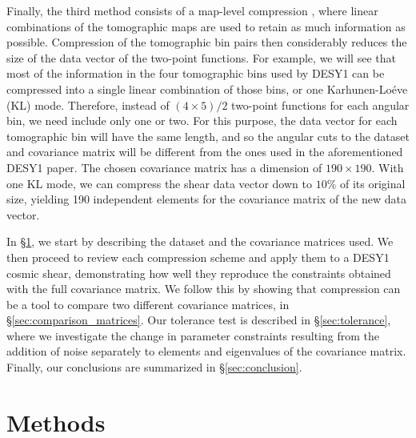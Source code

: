 \documentclass[aps, prd, twocolumn, superscriptaddress, nofootinbib, amssymb, amsmath]{revtex4-2}
\newcommand{\rsec}[1]{\S\ref{sec:#1}}
\begin{document}
Finally, the third method consists of a map-level compression \cite{Alonso:2017hhj}, where linear combinations of the tomographic maps are used to retain as much information as possible. Compression of the tomographic bin pairs then considerably reduces the size of the data vector of the two-point functions. For example, we will see that most of the information in the four tomographic bins used by DESY1 can be compressed into a single linear combination of those bins, or one Karhunen-Lo\'eve (KL) mode. Therefore, instead of $(4\times5)/2$ two-point functions for each angular bin, we need include only one or two. For this purpose, the data vector for each tomographic bin will have the same length, and so the angular cuts to the dataset and covariance matrix will be different from the ones used in the aforementioned DESY1 paper. The chosen covariance matrix has a dimension of $190 \times 190$. With one KL mode, we can compress the shear data vector down to $10\%$ of its original size, yielding 190 independent elements for the covariance matrix of the new data vector.


In \rsec{methods}, we start by describing the dataset and the covariance matrices used. We then proceed to review each compression scheme and apply them to a DESY1 cosmic shear, demonstrating how well they reproduce the constraints obtained with the full covariance matrix. We follow this by showing that compression can be a  tool to compare two different covariance matrices, in \rsec{comparison_matrices}. Our tolerance test is described in \rsec{tolerance}, where we investigate the change in parameter constraints resulting from the addition of noise separately to elements and eigenvalues of the covariance matrix. Finally, our conclusions are summarized in \rsec{conclusion}. 

\section{Methods}
\label{sec:methods}
\end{document}
